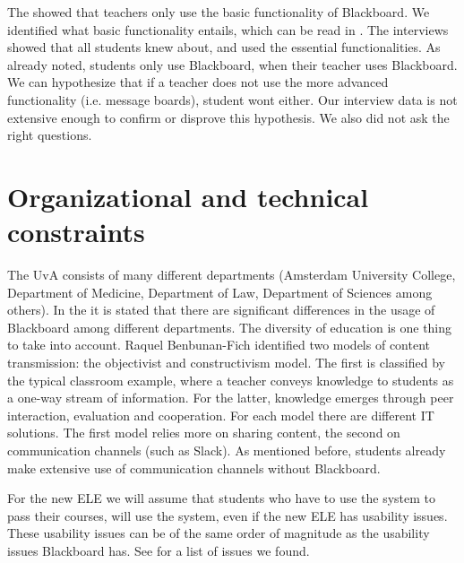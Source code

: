 The \rreport showed that teachers only use the basic functionality of Blackboard. We identified what basic functionality entails, which can be read in . The interviews showed that all students knew about, and used the essential functionalities. As already noted, students only use Blackboard, when their teacher uses Blackboard. We can hypothesize that if a teacher does not use the more advanced functionality (i.e. message boards), student wont either. Our interview data is not extensive enough to confirm or disprove this hypothesis. We also did not ask the right questions. 

\section{Organizational and technical constraints}
The UvA consists of many different departments (Amsterdam University College, Department of Medicine, Department of Law, Department of Sciences among others). In the \rreport it is stated that there are significant differences in the usage of Blackboard among different departments. The diversity of education is one thing to take into account. Raquel Benbunan-Fich \cite{improveEducationWithIt} identified two models of content transmission: the objectivist and constructivism model. The first is classified by the typical classroom example, where a teacher conveys knowledge to students as a one-way stream of information. For the latter, knowledge emerges through peer interaction, evaluation and cooperation. For each model there are different IT solutions. The first model relies more on sharing content, the second on communication channels (such as Slack). As mentioned before, students already make extensive use of communication channels without Blackboard. \\

For the new ELE we will assume that students who have to use the system to pass their courses, will use the system, even if the new ELE has usability issues. These usability issues can be of the same order of magnitude as the usability issues Blackboard has. See  for a list of issues we found. 

